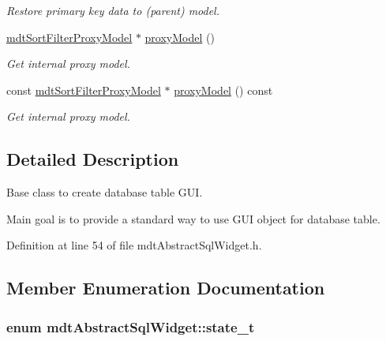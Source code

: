 \begin{DoxyCompactItemize}
\begin{DoxyCompactList}\small\item\em Restore primary key data to (parent) model. \end{DoxyCompactList}\item 
\hyperlink{classmdt_sort_filter_proxy_model}{mdt\-Sort\-Filter\-Proxy\-Model} $\ast$ \hyperlink{classmdt_abstract_sql_widget_ab522e27f86e2bab42616cac581f31ac5}{proxy\-Model} ()
\begin{DoxyCompactList}\small\item\em Get internal proxy model. \end{DoxyCompactList}\item 
const \hyperlink{classmdt_sort_filter_proxy_model}{mdt\-Sort\-Filter\-Proxy\-Model} $\ast$ \hyperlink{classmdt_abstract_sql_widget_ac3b54b54289e7366c5fa80091c0d48b4}{proxy\-Model} () const 
\begin{DoxyCompactList}\small\item\em Get internal proxy model. \end{DoxyCompactList}\end{DoxyCompactItemize}


\subsection{Detailed Description}
Base class to create database table G\-U\-I. 

Main goal is to provide a standard way to use G\-U\-I object for database table. 

Definition at line 54 of file mdt\-Abstract\-Sql\-Widget.\-h.



\subsection{Member Enumeration Documentation}
\hypertarget{classmdt_abstract_sql_widget_a54e6a7f2b41fb3edfa1e4ed62abf4072}{
\subsubsection[{state\-\_\-t}]{\setlength{\rightskip}{0pt plus 5cm}enum {\bf mdt\-Abstract\-Sql\-Widget\-::state\-\_\-t}}}\label{classmdt_abstract_sql_widget_a54e6a7f2b41fb3edfa1e4ed62abf4072}


